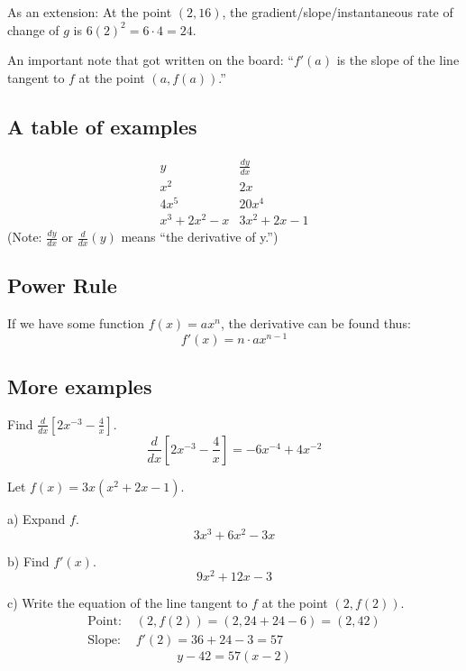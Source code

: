 \documentclass[12pt, letterpaper]{article}
\begin{document}
As an extension: At the point $(2, 16)$, the gradient/slope/instantaneous rate of change of $g$ is $6(2)^2=6\cdot4=\boxed{24}$.

An important note that got written on the board: ``$f'(a)$ is the slope of the line tangent to $f$ at the point $(a, f(a))$.''

\subsection{A table of examples}
$$\begin{array}{r|l}
    y & \frac{dy}{dx} \\ \hline
    x^2 & 2x \\
    4x^5 & 20x^4 \\
    x^3+2x^2-x & 3x^2+2x-1
\end{array}$$
(Note: $\frac{dy}{dx}$ or $\frac{d}{dx}(y)$ means ``the derivative of y.'')

\subsection{Power Rule}
If we have some function $f(x)=ax^n$, the derivative can be found thus:
\begin{equation*}
    f'(x)=n\cdot ax^{n-1}
\end{equation*}

\subsection{More examples}
Find $\frac{d}{dx}[2x^{-3}-\frac{4}{x}]$.
\begin{equation*}
    \frac{d}{dx}[2x^{-3}-\frac{4}{x}] = -6x^{-4}+4x^{-2}
\end{equation*}

Let $f(x)=3x(x^2+2x-1)$.

a) Expand $f$.
\begin{equation*}
    3x^3+6x^2-3x
\end{equation*}

b) Find $f'(x)$.
\begin{equation*}
    9x^2+12x-3
\end{equation*}

c) Write the equation of the line tangent to $f$ at the point $(2, f(2))$.
\begin{align*}
    \text{Point: } & (2, f(2)) = (2, 24+24-6)=(2, 42) \\
    \text{Slope: } & f'(2)=36+24-3=57
\end{align*}
\begin{equation*}
    y-42=57(x-2)
\end{equation*}
\end{document}
